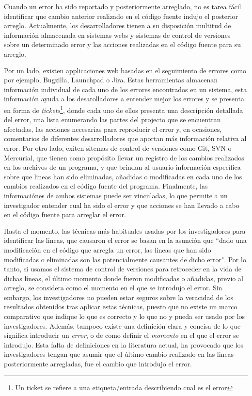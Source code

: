 \documentclass[a4paper, 12pt]{book}
\begin{document}
Cuando un error ha sido reportado y posteriormente arreglado, no es tarea f\'acil identificar que cambio anterior realizado en el c\'odigo fuente indujo el posterior arreglo. Actualmente, los desarrolladores tienen a su disposici\'on multitud de informaci\'on almacenada en sistemas webs y sistemas de control de versiones sobre un determinado error y las acciones realizadas en el c\'odigo fuente para su arreglo.

Por un lado, existen applicaciones web basadas en el seguimiento de errores como por ejemplo, Bugzilla, Launchpad o Jira. Estas herramientas almacenan informaci\'on individual de cada uno de los errores encontrados en un sistema, esta informaci\'on ayuda a los desarolladores a entender mejor los errores y se presenta en forma de \emph{tickets}\footnote{Un ticket se refiere a una etiqueta/entrada describiendo cual es el error}, donde cada uno de ellos presenta una descripci\'on detallada del error, una lista enumerando las partes del projecto que se encuentran afectadas, las acciones necesarias para reproducir el error y, en ocasiones, comentarios de diferentes desarrolladores que aportan m\'as informaci\'on relativa al error. Por otro lado, exiten sitemas de control de versiones como Git, SVN o Mercurial, que tienen como prop\'osito llevar un registro de los cambios realizados en los archivos de un programa, y que brindan al usuario informaci\'on espec\'ifica sobre que lineas han sido eliminadas, a\~nadidas o modificadas en cada uno de los cambios realizados en el c\'odigo fuente del programa. Finalmente, las informaci\'ones de ambos sistemas puede ser vinculadas, lo que permite a un investigador entender cual ha sido el error y que acciones se han llevado a cabo en el c\'odigo fuente para arreglar el error.

Hasta el momento, las t\'ecnicas m\'as habituales usadas por los investigadores para identificar las lineas, que causaron el error se basan en la asunci\'on que ``dado una modificaci\'on en el c\'odigo que arregla un error, las l\'ineas que han sido modificadas o eliminadas son las potencialmente causantes de dicho error". Por lo tanto, si usamos el sistema de control de versiones para retroceder en la vida de dichas l\'ineas, el \'ultimo momento donde fueron modificadas o a\~nadidas, previo al arreglo, se considera como el momento en el que se introdujo el error. Sin embargo, los investigadores no pueden estar seguros sobre la veracidad de los resultados obtenidos tras aplicar estas t\'ecnicas, puesto que no existe un marco comparativo que indique lo que es correcto y lo que no y pueda ser usado por los investigadores. Adem\'as, tampoco existe una definici\'on clara y concisa de lo que significa introducir un \emph{error}, o de como definir el \emph{momento} en el que el error se introdujo. Esta falta de definiciones en la literatura actual, ha provocado que los investigadores tengan que asumir que el \'ultimo cambio realizado en las lineas posteriormente arregladas, fue el cambio que introdujo el error.
\end{document}
